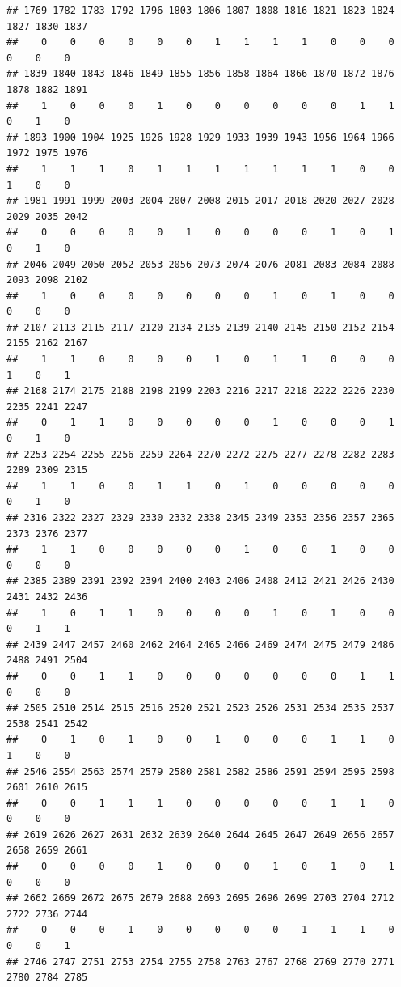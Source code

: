\documentclass[
]{article}
\begin{document}
\begin{verbatim}
## 1769 1782 1783 1792 1796 1803 1806 1807 1808 1816 1821 1823 1824 1827 1830 1837 
##    0    0    0    0    0    0    1    1    1    1    0    0    0    0    0    0 
## 1839 1840 1843 1846 1849 1855 1856 1858 1864 1866 1870 1872 1876 1878 1882 1891 
##    1    0    0    0    1    0    0    0    0    0    0    1    1    0    1    0 
## 1893 1900 1904 1925 1926 1928 1929 1933 1939 1943 1956 1964 1966 1972 1975 1976 
##    1    1    1    0    1    1    1    1    1    1    1    0    0    1    0    0 
## 1981 1991 1999 2003 2004 2007 2008 2015 2017 2018 2020 2027 2028 2029 2035 2042 
##    0    0    0    0    0    1    0    0    0    0    1    0    1    0    1    0 
## 2046 2049 2050 2052 2053 2056 2073 2074 2076 2081 2083 2084 2088 2093 2098 2102 
##    1    0    0    0    0    0    0    0    1    0    1    0    0    0    0    0 
## 2107 2113 2115 2117 2120 2134 2135 2139 2140 2145 2150 2152 2154 2155 2162 2167 
##    1    1    0    0    0    0    1    0    1    1    0    0    0    1    0    1 
## 2168 2174 2175 2188 2198 2199 2203 2216 2217 2218 2222 2226 2230 2235 2241 2247 
##    0    1    1    0    0    0    0    0    1    0    0    0    1    0    1    0 
## 2253 2254 2255 2256 2259 2264 2270 2272 2275 2277 2278 2282 2283 2289 2309 2315 
##    1    1    0    0    1    1    0    1    0    0    0    0    0    0    1    0 
## 2316 2322 2327 2329 2330 2332 2338 2345 2349 2353 2356 2357 2365 2373 2376 2377 
##    1    1    0    0    0    0    0    1    0    0    1    0    0    0    0    0 
## 2385 2389 2391 2392 2394 2400 2403 2406 2408 2412 2421 2426 2430 2431 2432 2436 
##    1    0    1    1    0    0    0    0    1    0    1    0    0    0    1    1 
## 2439 2447 2457 2460 2462 2464 2465 2466 2469 2474 2475 2479 2486 2488 2491 2504 
##    0    0    1    1    0    0    0    0    0    0    0    1    1    0    0    0 
## 2505 2510 2514 2515 2516 2520 2521 2523 2526 2531 2534 2535 2537 2538 2541 2542 
##    0    1    0    1    0    0    1    0    0    0    1    1    0    1    0    0 
## 2546 2554 2563 2574 2579 2580 2581 2582 2586 2591 2594 2595 2598 2601 2610 2615 
##    0    0    1    1    1    0    0    0    0    0    1    1    0    0    0    0 
## 2619 2626 2627 2631 2632 2639 2640 2644 2645 2647 2649 2656 2657 2658 2659 2661 
##    0    0    0    0    1    0    0    0    1    0    1    0    1    0    0    0 
## 2662 2669 2672 2675 2679 2688 2693 2695 2696 2699 2703 2704 2712 2722 2736 2744 
##    0    0    0    1    0    0    0    0    0    1    1    1    0    0    0    1 
## 2746 2747 2751 2753 2754 2755 2758 2763 2767 2768 2769 2770 2771 2780 2784 2785 

\end{verbatim}
\end{document}
